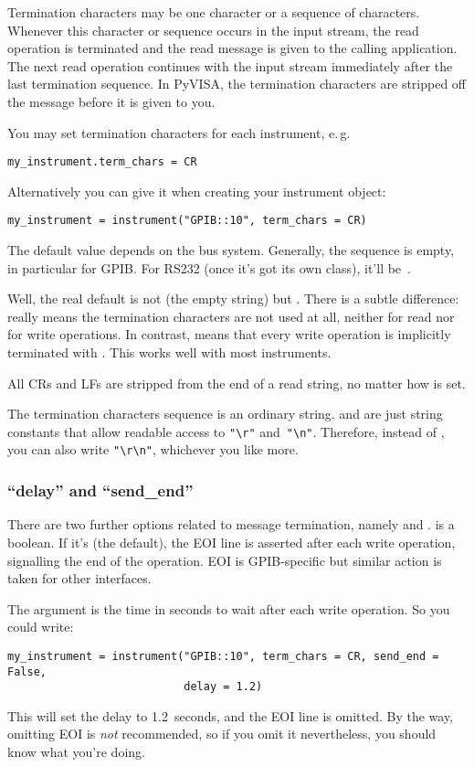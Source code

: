 \documentclass{howto}
\begin{document}
Termination characters may be one character or a sequence of characters.
Whenever this character or sequence occurs in the input stream, the read
operation is terminated and the read message is given to the calling
application.  The next read operation continues with the input stream
immediately after the last termination sequence.  In PyVISA, the termination
characters are stripped off the message before it is given to you.

You may set termination characters for each instrument, e.\,g.
\begin{verbatim}
my_instrument.term_chars = CR
\end{verbatim}
Alternatively you can give it when creating your instrument object:
\begin{verbatim}
my_instrument = instrument("GPIB::10", term_chars = CR)
\end{verbatim}
The default value depends on the bus system.  Generally, the sequence is empty,
in particular for GPIB\@.  For RS232 (once it's got its own class), it'll
be~\@.

Well, the real default is not  (the empty string) but .
There is a subtle difference:  really means the termination characters
are not used at all, neither for read nor for write operations.  In contrast,
 means that every write operation is implicitly terminated with
\@.  This works well with most instruments.

All CRs and LFs are stripped from the end of a read string, no matter how
 is set.

The termination characters sequence is an ordinary string.   and
 are just string constants that allow readable access to \verb|"\r"|
and~\verb|"\n"|.  Therefore, instead of , you can also write
\verb|"\r\n"|, whichever you like more.

\subsubsection{``delay'' and ``send\_end''}

There are two further options related to message termination, namely
 and .   is a boolean.  If it's
 (the default), the EOI line is asserted after each write operation,
signalling the end of the operation.  EOI is GPIB-specific but similar action
is taken for other interfaces.

The argument  is the time in seconds to wait after each write
operation.  So you could write:
\begin{verbatim}
my_instrument = instrument("GPIB::10", term_chars = CR, send_end = False,
                           delay = 1.2)
\end{verbatim}
This will set the delay to 1.2~seconds, and the EOI line is omitted.  By the
way, omitting EOI is \emph{not} recommended, so if you omit it nevertheless,
you should know what you're doing.
\end{document}
